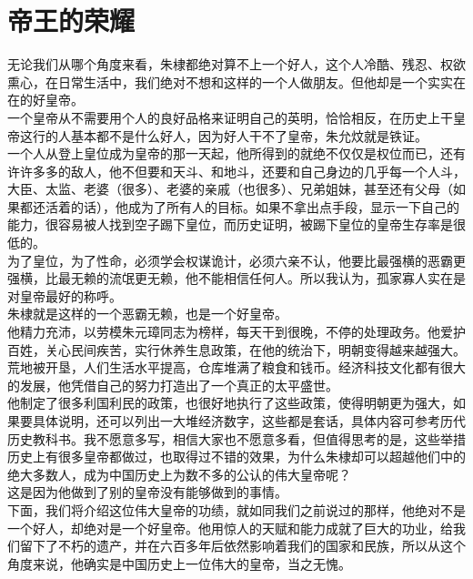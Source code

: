 \section{帝王的荣耀}
\ifnum{}
	\begin{multicols}{\theparacolNo}
\fi
无论我们从哪个角度来看，朱棣都绝对算不上一个好人，这个人冷酷、残忍、权欲熏心，在日常生活中，我们绝对不想和这样的一个人做朋友。但他却是一个实实在在的好皇帝。\\

一个皇帝从不需要用个人的良好品格来证明自己的英明，恰恰相反，在历史上干皇帝这行的人基本都不是什么好人，因为好人干不了皇帝，朱允炆就是铁证。\\

一个人从登上皇位成为皇帝的那一天起，他所得到的就绝不仅仅是权位而已，还有许许多多的敌人，他不但要和天斗、和地斗，还要和自己身边的几乎每一个人斗，大臣、太监、老婆（很多）、老婆的亲戚（也很多）、兄弟姐妹，甚至还有父母（如果都还活着的话），他成为了所有人的目标。如果不拿出点手段，显示一下自己的能力，很容易被人找到空子踢下皇位，而历史证明，被踢下皇位的皇帝生存率是很低的。\\

为了皇位，为了性命，必须学会权谋诡计，必须六亲不认，他要比最强横的恶霸更强横，比最无赖的流氓更无赖，他不能相信任何人。所以我认为，孤家寡人实在是对皇帝最好的称呼。\\

朱棣就是这样的一个恶霸无赖，也是一个好皇帝。\\

他精力充沛，以劳模朱元璋同志为榜样，每天干到很晚，不停的处理政务。他爱护百姓，关心民间疾苦，实行休养生息政策，在他的统治下，明朝变得越来越强大。荒地被开垦，人们生活水平提高，仓库堆满了粮食和钱币。经济科技文化都有很大的发展，他凭借自己的努力打造出了一个真正的太平盛世。\\

他制定了很多利国利民的政策，也很好地执行了这些政策，使得明朝更为强大，如果要具体说明，还可以列出一大堆经济数字，这些都是套话，具体内容可参考历代历史教科书。我不愿意多写，相信大家也不愿意多看，但值得思考的是，这些举措历史上有很多皇帝都做过，也取得过不错的效果，为什么朱棣却可以超越他们中的绝大多数人，成为中国历史上为数不多的公认的伟大皇帝呢？\\

这是因为他做到了别的皇帝没有能够做到的事情。\\

下面，我们将介绍这位伟大皇帝的功绩，就如同我们之前说过的那样，他绝对不是一个好人，却绝对是一个好皇帝。他用惊人的天赋和能力成就了巨大的功业，给我们留下了不朽的遗产，并在六百多年后依然影响着我们的国家和民族，所以从这个角度来说，他确实是中国历史上一位伟大的皇帝，当之无愧。\\


\end{multicols}
